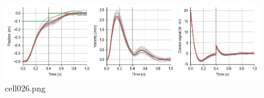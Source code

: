 \begin{figure}[ht]
	\centering
	\includegraphics[scale=0.8, max width=\linewidth]{./fig/motor-learning/infinite-horizon-ofc/cell026.png}
	\caption{cell026.png}
	\label{cell026.png}
\end{figure}